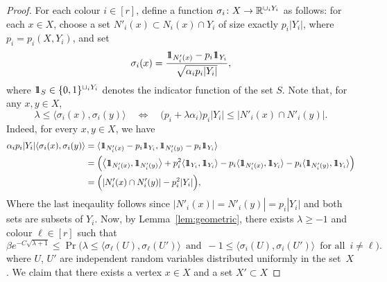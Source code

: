 \begin{proof}

  For each colour \(i \in [r]\), define a function \(\sigma_i \colon X \to \R^{\cup_i Y_i}\) as follows: for each \(x \in X\), choose a set \(N'_i(x) \subset N_i(x) \cap Y_i\) of size exactly \(p_i|Y_i|\), where \(p_i = p_i(X,Y_i)\), and set
  \begin{equation*}
    \sigma_i(x) = \frac{\id_{N'_i(x)} - p_i\id_{Y_i}}{\sqrt{\alpha_ip_i|Y_i|}},
  \end{equation*}
  where \(\id_S \in \{0,1\}^{\cup_i Y_i}\) denotes the indicator function of the set \(S\). Note that, for any \(x,y\in X\),
  \begin{equation*}
    \lambda \le \big\langle \sigma_i(x),\sigma_i(y) \big\rangle \quad \Leftrightarrow \quad \big( p_i + \lambda\alpha_i \big) p_i |Y_i| \le |N'_i(x) \cap N'_i(y)|.
  \end{equation*}
  Indeed, for every \(x,y\in X\), we have 
  \begin{multline}
    \begin{aligned}
            \alpha_ip_i|Y_i| \langle \sigma_i(x),\sigma_i(y) \rangle &= \langle \id_{N'_i(x)}- p_i\id_{Y_i},\id_{N'_i(y)}- p_i\id_{Y_i}\rangle\\
            &= \Bigl(\big\langle \id_{N'_i(x)},\id_{N'_i(y)}\big\rangle +p_i^2\langle \id_{Y_i},
            \id_{Y_i}\rangle - p_i \langle \id_{N'_i(x)},\id_{Y_i}\rangle- p_i \langle \id_{N'_i(y)},\id_{Y_i}\rangle\Bigr)\\
            &= \Bigl(|N'_i(x) \cap N'_i(y)|-p_i^2|Y_i| \Bigr),
    \end{aligned}
  \end{multline}
  Where the last ineqaulity follows since \(|N'_i(x)|= N'_i(y)|= p_i|Y_i|\) and both sets are subsets of \(Y_i\).
  Now, by Lemma~\ref{lem:geometric}, there exists \(\lambda \ge -1\) and colour \(\ell \in [r]\) such that
  \begin{equation}
    \label{eq: geometric-app}
    \beta e^{- C\sqrt{\lambda + 1}} \le \Pr\Big( \lambda  \le \big\langle \sigma_\ell(U),\sigma_\ell(U') \big\rangle \, \text{ and } \, -1 \le \big\langle \sigma_i(U), \sigma_i(U') \big\rangle \, \text{ for all } \, i \ne \ell \Big) .
  \end{equation}
  where \(U\), \(U'\) are independent random variables distributed uniformly in the set~\(X\). We claim that there exists a vertex \(x \in X\) and a set \(X' \subset X\)

\end{proof}
